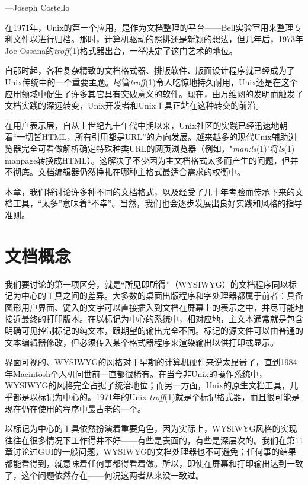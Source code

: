 \documentclass[12pt,oneside]{ctexbook}
\begin{document}
\begin{common-format}
\begin{flushright}
\begin{notecard}{28em}
{\hfill —Joseph Costello }
\end{notecard}
\end{flushright}

在1971年，Unix的第一个应用，是作为文档整理的平台——Bell实验室用来整理专利文件以进行归档。那时，计算机驱动的照排还是新颖的想法，但几年后，1973年Joe Ossana的\textit{troff}(1)格式器出台，一举决定了这门艺术的地位。

自那时起，各种复杂精致的文档格式器、排版软件、版面设计程序就已经成为了Unix传统中的一个重要主题。尽管\textit{troff}(1)令人吃惊地持久耐用，Unix还是在这个应用领域中促生了许多其它具有突破意义的软件。现在，由万维网的发明而触发了文档实践的深远转变，Unix开发者和Unix工具正站在这种转交的前沿。

在用户表示层，自从上世纪九十年代中期以来，Unix社区的实践已经迅速地朝着“一切皆HTML，所有引用都是URL”的方向发展。越来越多的现代Unix辅助浏览器完全可看做解析确定特殊种类URL的网页浏览器（例如，"\textit{man:ls}(1)"将\textit{ls}(1) manpage转换成HTML）。这解决了不少因为主文档格式太多而产生的问题，但并不彻底。文档编辑器仍然挣扎在哪种主格式最适合需求的权衡中。

本章，我们将讨论许多种不同的文档格式，以及经受了几十年考验而传承下来的文档工具，“太多”意味着“不幸”。当然，我们也会逐步发展出良好实践和风格的指导准则。

\section{文档概念}
我们要讨论的第一项区分，就是“所见即所得”（WYSIWYG）的文档程序同以标记为中心的工具之间的差异。大多数的桌面出版程序和字处理器都属于前者：具备图形用户界面、键入的文字可以直接插入到文档在屏幕上的表示之中，并尽可能地接近最终的打印版本。在以标记为中心的系统中，相对应地，主文本通常就是包含明确可见控制标记的纯文本，跟期望的输出完全不同。标记的源文件可以由普通的文本编辑器修改，但必须传入某个格式器程序来渲染输出以供打印或显示。

界面可视的、WYSIWYG的风格对于早期的计算机硬件来说太昂贵了，直到1984年Macintosh个人机问世前一直都很稀有。在当今非Unix的操作系统中，WYSIWYG的风格完全占据了统治地位；而另一方面，Unix的原生文档工具，几乎都是以标记为中心的。1971年的Unix \textit{troff}(1)就是个标记格式器，而且很可能是现在仍在使用的程序中最古老的一个。

以标记为中心的工具依然扮演着重要角色，因为实际上，WYSIWYG风格的实现往往在很多情况下工作得并不好——有些是表面的，有些是深层次的。我们在第11章讨论过GUI的一般问题，WYSIWYG的文档处理器也不可避免；任何事的结果都能看得到，就意味着任何事都得看着做。所以，即使在屏幕和打印输出达到一致了，这个问题依然存在——何况这两者从来没一致过。


\end{common-format}
\end{document}
